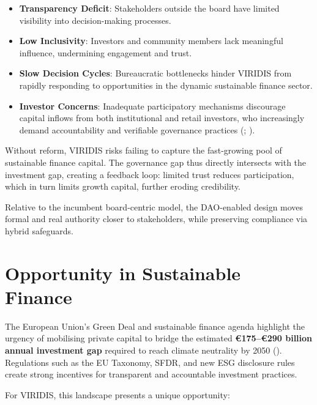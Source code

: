 \documentclass[
  english,
  12pt,
  oneside,
  open=any]{scrbook}
\providecommand{\tightlist}{%
  \setlength{\itemsep}{0pt}\setlength{\parskip}{0pt}}\usepackage{longtable,booktabs,array}
\begin{document}
\begin{itemize}
\tightlist
\item
  \textbf{Transparency Deficit}: Stakeholders outside the board have
  limited visibility into decision-making processes.\\
\item
  \textbf{Low Inclusivity}: Investors and community members lack
  meaningful influence, undermining engagement and trust.\\
\item
  \textbf{Slow Decision Cycles}: Bureaucratic bottlenecks hinder VIRIDIS
  from rapidly responding to opportunities in the dynamic sustainable
  finance sector.\\
\item
  \textbf{Investor Concerns}: Inadequate participatory mechanisms
  discourage capital inflows from both institutional and retail
  investors, who increasingly demand accountability and verifiable
  governance practices
  (;
  ).
\end{itemize}

Without reform, VIRIDIS risks failing to capture the fast-growing pool
of sustainable finance capital. The governance gap thus directly
intersects with the investment gap, creating a feedback loop: limited
trust reduces participation, which in turn limits growth capital,
further eroding credibility.

Relative to the incumbent board-centric model, the DAO-enabled design
moves formal and real authority closer to stakeholders, while preserving
compliance via hybrid safeguards.

\section{Opportunity in Sustainable Finance}\label{sec-opportunity}

The European Union's Green Deal and sustainable finance agenda highlight
the urgency of mobilising private capital to bridge the estimated
\textbf{€175--€290 billion annual investment gap} required to reach
climate neutrality by 2050
(). Regulations such as the EU Taxonomy, SFDR, and new ESG
disclosure rules create strong incentives for transparent and
accountable investment practices.

For VIRIDIS, this landscape presents a unique opportunity:
\end{document}
